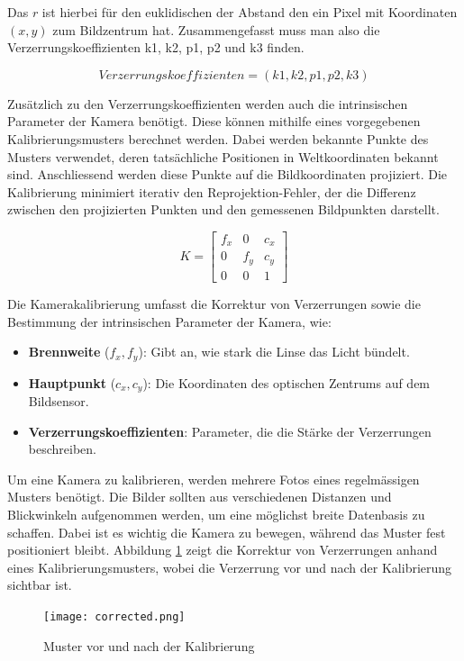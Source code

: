 Das \(r\) ist hierbei für den euklidischen der Abstand den ein Pixel mit Koordinaten \((x, y)\) zum Bildzentrum hat.
Zusammengefasst muss man also die Verzerrungskoeffizienten k1, k2, p1, p2 und k3 finden.

\[
Verzerrungskoeffizienten = (k1, k2, p1, p2, k3)
\]

Zusätzlich zu den Verzerrungskoeffizienten werden auch die intrinsischen Parameter der Kamera benötigt. Diese können 
mithilfe eines vorgegebenen Kalibrierungsmusters berechnet werden. Dabei werden bekannte Punkte des Musters verwendet,
deren tatsächliche Positionen in Weltkoordinaten bekannt sind. Anschliessend werden diese Punkte auf die Bildkoordinaten
projiziert. Die Kalibrierung minimiert iterativ den Reprojektion-Fehler, der die Differenz zwischen den projizierten 
Punkten und den gemessenen Bildpunkten darstellt.

\[
K =
\begin{bmatrix}
f_x & 0 & c_x \\
0 & f_y & c_y \\
0 & 0 & 1
\end{bmatrix}
\]

Die Kamerakalibrierung umfasst die Korrektur von Verzerrungen sowie die Bestimmung der 
intrinsischen Parameter der Kamera, wie:

\begin{itemize}
    \item \textbf{Brennweite} (\( f_x, f_y \)): Gibt an, wie stark die Linse das Licht bündelt.
    \item \textbf{Hauptpunkt} (\( c_x, c_y \)): Die Koordinaten des optischen Zentrums auf dem Bildsensor.
    \item \textbf{Verzerrungskoeffizienten}: Parameter, die die Stärke der Verzerrungen beschreiben.
\end{itemize}


Um eine Kamera zu kalibrieren, werden mehrere Fotos eines regelmässigen Musters 
benötigt. Die Bilder sollten aus verschiedenen Distanzen und Blickwinkeln aufgenommen werden,
um eine möglichst breite Datenbasis zu schaffen. Dabei ist es wichtig die Kamera zu bewegen, während
das Muster fest positioniert bleibt. Abbildung \ref{fig:corrected} zeigt die Korrektur von Verzerrungen
anhand eines Kalibrierungsmusters, wobei die Verzerrung vor und nach der Kalibrierung sichtbar ist.

\begin{figure}[H]
    \texttt{[image: corrected.png]}
    \caption{Muster vor und nach der Kalibrierung}
    \label{fig:corrected}
\end{figure}

